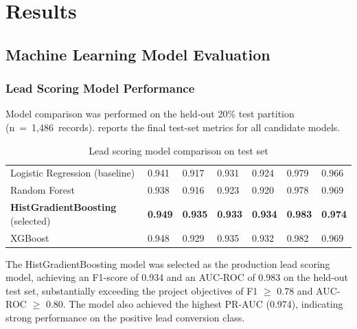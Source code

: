\chapter{Results}
\label{chap:05}
\setlength{\parskip}{1em}

\section{Machine Learning Model Evaluation}

\subsection{Lead Scoring Model Performance}

Model comparison was performed on the held-out 20\% test partition
(n~=~1,486~records).  reports the final test-set
metrics for all candidate models.

\begin{table}[H]
  \centering
  \caption{Lead scoring model comparison on test set}
  \label{tab:lead_results}
  \begin{tabularx}{\textwidth}{@{}L{3.8cm} C{1.5cm} C{1.5cm} C{1.5cm}
    C{1.5cm} C{1.6cm} C{1.6cm}@{}}
    \toprule
     &  &  &  &
     &  &  \\
    \midrule
    Logistic Regression (baseline) &
      0.941 & 0.917 & 0.931 & 0.924 & 0.979 & 0.966 \\
    Random Forest &
      0.938 & 0.916 & 0.923 & 0.920 & 0.978 & 0.969 \\
    \textbf{HistGradientBoosting} (selected) &
      \textbf{0.949} & \textbf{0.935} & \textbf{0.933} &
      \textbf{0.934} & \textbf{0.983} & \textbf{0.974} \\
    XGBoost &
      0.948 & 0.929 & 0.935 & 0.932 & 0.982 & 0.969 \\
    \bottomrule
  \end{tabularx}
\end{table}

The HistGradientBoosting model was selected as the production lead
scoring model, achieving an F1-score of 0.934 and an AUC-ROC of 0.983
on the held-out test set, substantially exceeding the project
objectives of F1 $\geq$ 0.78 and AUC-ROC $\geq$ 0.80. The model also
achieved the highest PR-AUC (0.974), indicating strong performance on
the positive lead conversion class.

